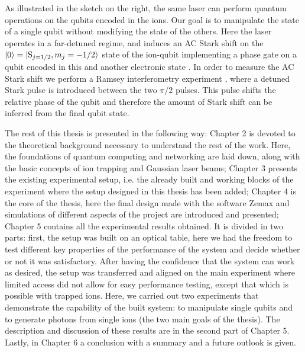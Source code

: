 \documentclass[english, a4paper, 12pt, twoside]{book}
\numberwithin{equation}{section} %
\begin{document}
As illustrated in the sketch on the right, the same laser can perform quantum operations on the qubits encoded in the ions. Our goal is to manipulate the state of a single qubit without modifying the state of the others. Here the laser operates in a far-detuned regime, and induces an AC Stark shift on the $\ket{0} = \ket{\text{S}_{j=1/2}, m_j=-1/2}$ state of the ion-qubit implementing a phase gate on a qubit encoded in this and another electronic state \cite{chuang}. In order to measure the AC Stark shift we perform a Ramsey interferometry experiment \cite{starkshift}, where a detuned Stark pulse is introduced between the two $\pi/2$ pulses. This pulse shifts the relative phase of the qubit and therefore the amount of Stark shift can be inferred from the final qubit state.\par
The rest of this thesis is presented in the following way: Chapter 2 is devoted to the theoretical background necessary to understand the rest of the work. Here, the foundations of quantum computing and networking are laid down, along with the basic concepts of ion trapping and Gaussian laser beams; Chapter 3 presents the existing experimental setup, i.e. the already built and working blocks of the experiment where the setup designed in this thesis has been added; Chapter 4 is the core of the thesis, here the final design made with the software Zemax and simulations of different aspects of the project are introduced and presented; Chapter 5 contains all the experimental results obtained. It is divided in two parts: first, the setup was built on an optical table, here we had the freedom to test different key properties of the performance of the system and decide whether or not it was satisfactory. After having the confidence that the system can work as desired, the setup was transferred and aligned on the main experiment where limited access did not allow for easy performance testing, except that which is possible with trapped ions. Here, we carried out two experiments that demonstrate the capability of the built system: to manipulate single qubits and to generate photons from single ions (the two main goals of the thesis). The description and discussion of these results are in the second part of Chapter 5. Lastly, in Chapter 6 a conclusion with a summary and a future outlook is given.







\end{document}
